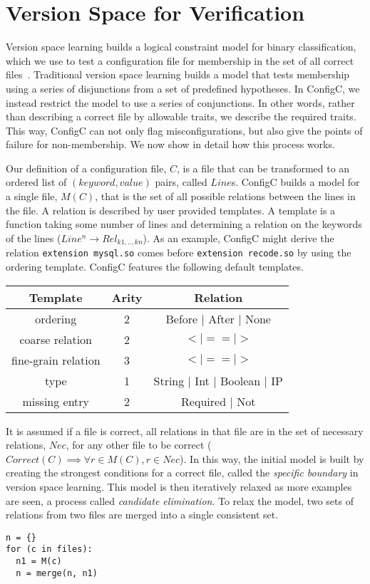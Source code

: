 \section{Version Space for Verification}

Version space learning builds a logical constraint model for binary classification, which we use to test a configuration file for membership in the set of all correct files~\cite{mitchell82}.
Traditional version space learning builds a model that tests membership using a series of disjunctions from a set of predefined hypotheses.
In ConfigC, we instead restrict the model to use a series of conjunctions.
In other words, rather than describing a correct file by allowable traits, we describe the required traits. 
This way, ConfigC can not only flag misconfigurations, but also give the points of failure for non-membership.
We now show in detail how this process works.

Our definition of a configuration file, $C$, is a file that can be transformed to an ordered list of $(keyword, value)$ pairs, called $Line$s.
ConfigC builds a model for a single file, $M(C)$, that is the set of all possible relations between the lines in the file.
A relation is described by user provided templates.
A template is a function taking some number of lines and determining a relation on the keywords of the lines ($Line^{n} \rightarrow Rel_{k1,..,kn}$).
As an example, ConfigC might derive the relation \texttt{extension mysql.so} comes before \texttt{extension recode.so} by using the ordering template.
ConfigC features the following default templates.

\begin{center}
\begin{tabular} {|c |c |c |}
 \hline
 Template & Arity & Relation \\
\hline
 ordering &            2 & Before $\vert$ After $\vert$ None \\
\hline
 coarse relation &     2  & $< | == | >$  \\
\hline
 fine-grain relation & 3  & $< | == | >$  \\
\hline
 type &                1  & String $\vert$ Int $\vert$ Boolean $\vert$ IP  \\
\hline
 missing entry &       2 & Required $\vert$ Not \\
\hline
\end{tabular}
\end{center}

It is assumed if a file is correct, all relations in that file are in the set of necessary relations, $Nec$, for any other file to be correct ($Correct(C) \implies \forall r \in M(C), r \in Nec$).
In this way, the initial model is built by creating the strongest conditions for a correct file, called the \textit{specific boundary} in version space learning.
This model is then iteratively relaxed as more examples are seen, a process called \textit{candidate elimination}.
To relax the model, two sets of relations from two files are merged into a single consistent set.
\begin{lstlisting}
n = {}
for (c in files):
  n1 = M(c)
  n = merge(n, n1)
\end{lstlisting}

